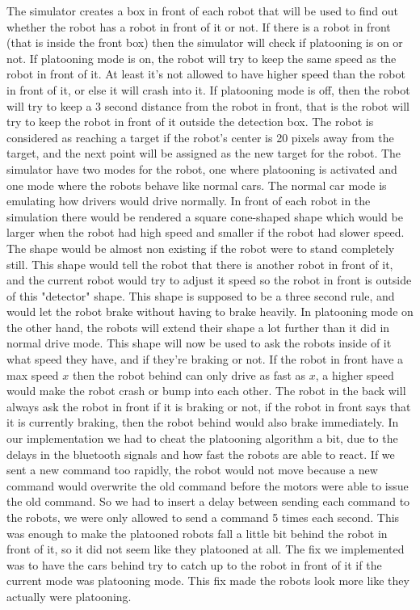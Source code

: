 The simulator creates a box in front of each robot that will be used to find out whether the robot has a robot in front of it or not. If there is a robot in front (that is inside the front box) then the simulator will check if platooning is on or not. If platooning mode is on, the robot will try to keep the same speed as the robot in front of it. At least it's not allowed to have higher speed than the robot in front of it, or else it will crash into it. If platooning mode is off, then the robot will try to keep a 3 second distance from the robot in front, that is the robot will try to keep the robot in front of it outside the detection box. The robot is considered as reaching a target if the robot's center is 20 pixels away from the target, and the next point will be assigned as the new target for the robot.
The simulator have two modes for the robot, one where platooning is activated and one mode where the robots behave like normal cars. The normal car mode is emulating how drivers would drive normally. In front of each robot in the simulation there would be rendered a square cone-shaped shape which would be larger when the robot had high speed and smaller if the robot had slower speed. The shape would be almost non existing if the robot were to stand completely still. This shape would tell the robot that there is another robot in front of it, and the current robot would try to adjust it speed so the robot in front is outside of this "detector" shape. This shape is supposed to be a three second rule, and would let the robot brake without having to brake heavily.
In platooning mode on the other hand, the robots will extend their shape a lot further than it did in normal drive mode. This shape will now be used to ask the robots inside of it what speed they have, and if they're braking or not.
If the robot in front have a max speed $x$ then the robot behind can only drive as fast as $x$, a higher speed would make the robot crash or bump into each other.
The robot in the back will always ask the robot in front if it is braking or not, if the robot in front says that it is currently braking, then the robot behind would also brake immediately.
In our implementation we had to cheat the platooning algorithm a bit, due to the delays in the bluetooth signals and how fast the robots are able to react. If we sent a new command too rapidly, the robot would not move because a new command would overwrite the old command before the motors were able to issue the old command. So we had to insert a delay between sending each command to the robots, we were only allowed to send a command 5 times each second. This was enough to make the platooned robots fall a little bit behind the robot in front of it, so it did not seem like they platooned at all. The fix we implemented was to have the cars behind try to catch up to the robot in front of it if the current mode was platooning mode. This fix made the robots look more like they actually were platooning.\\

